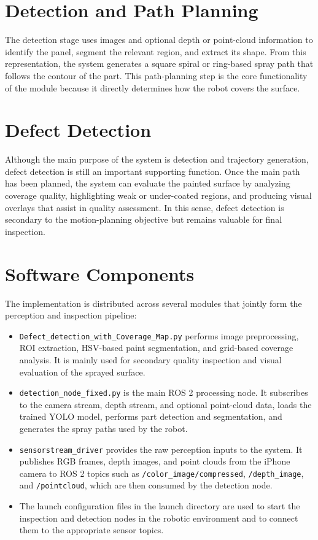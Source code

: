 \section{Detection and Path Planning}
The detection stage uses images and optional depth or point-cloud information to identify the panel, segment the relevant region, and extract its shape. From this representation, the system generates a square spiral or ring-based spray path that follows the contour of the part. This path-planning step is the core functionality of the module because it directly determines how the robot covers the surface.

\section{Defect Detection}
Although the main purpose of the system is detection and trajectory generation, defect detection is still an important supporting function. Once the main path has been planned, the system can evaluate the painted surface by analyzing coverage quality, highlighting weak or under-coated regions, and producing visual overlays that assist in quality assessment. In this sense, defect detection is secondary to the motion-planning objective but remains valuable for final inspection.

\section{Software Components}
The implementation is distributed across several modules that jointly form the perception and inspection pipeline:
\begin{itemize}
  \item \texttt{Defect\_detection\_with\_Coverage\_Map.py} performs image preprocessing, ROI extraction, HSV-based paint segmentation, and grid-based coverage analysis. It is mainly used for secondary quality inspection and visual evaluation of the sprayed surface.
  \item \texttt{detection\_node\_fixed.py} is the main ROS 2 processing node. It subscribes to the camera stream, depth stream, and optional point-cloud data, loads the trained YOLO model, performs part detection and segmentation, and generates the spray paths used by the robot.
  \item \texttt{sensorstream\_driver} provides the raw perception inputs to the system. It publishes RGB frames, depth images, and point clouds from the iPhone camera to ROS 2 topics such as \texttt{/color\_image/compressed}, \texttt{/depth\_image}, and \texttt{/pointcloud}, which are then consumed by the detection node.
  \item The launch configuration files in the launch directory are used to start the inspection and detection nodes in the robotic environment and to connect them to the appropriate sensor topics.
\end{itemize}


